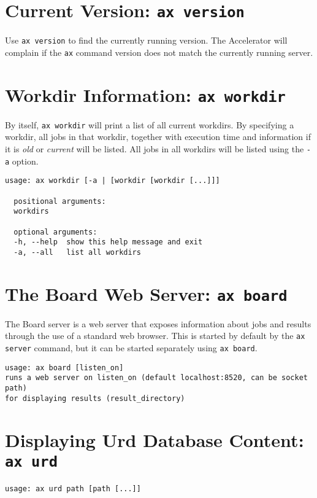 \begin{shell}
\section{Current Version: \texttt{ax version}}
Use \texttt{ax version} to find the currently running version.  The
Accelerator will complain if the \texttt{ax} command version does not
match the currently running server.


\section{Workdir Information: \texttt{ax workdir}}
By itself, \texttt{ax workdir} will print a list of all current
workdirs.  By specifying a workdir, all jobs in that workdir, together
with execution time and information if it is \textsl{old} or
\textsl{current} will be listed.  All jobs in all workdirs will be
listed using the \texttt{-a} option.
\begin{snugshade}
\begin{verbatim}
usage: ax workdir [-a | [workdir [workdir [...]]]

  positional arguments:
  workdirs

  optional arguments:
  -h, --help  show this help message and exit
  -a, --all   list all workdirs
\end{verbatim}
\end{snugshade}


\section{The Board Web Server: \texttt{ax board}}
The Board server is a web server that exposes information about jobs
and results through the use of a standard web browser.  This is
started by default by the \texttt{ax server} command, but it can be
started separately using \texttt{ax board}.
\begin{snugshade}
\begin{verbatim}
usage: ax board [listen_on]
runs a web server on listen_on (default localhost:8520, can be socket path)
for displaying results (result_directory)
\end{verbatim}
\end{snugshade}


\section{Displaying Urd Database Content: \texttt{ax urd}}
\begin{snugshade}
\begin{verbatim}
usage: ax urd path [path [...]]


\end{verbatim}
\end{snugshade}
\end{shell}

